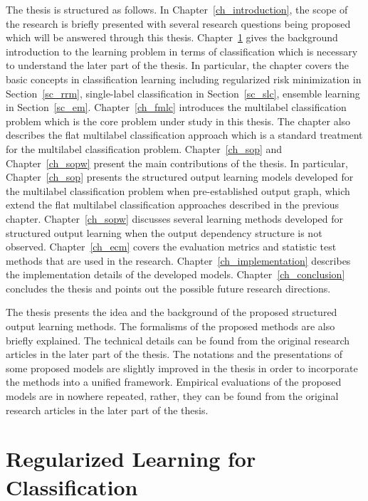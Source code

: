 The thesis is structured as follows.
In Chapter~\ref{ch_introduction}, the scope of the research is briefly presented with several research questions being proposed which will be answered through this thesis.
Chapter~\ref{ch_rlc} gives the background introduction to the learning problem in terms of classification which is necessary to understand the later part of the thesis.
In particular, the chapter covers the basic concepts in classification learning including regularized risk minimization in Section~\ref{sc_rrm}, single-label classification in Section~\ref{sc_slc}, ensemble learning in Section~\ref{sc_em}.
Chapter~\ref{ch_fmlc} introduces the multilabel classification problem which is the core problem under study in this thesis.
The chapter also describes the flat multilabel classification approach which is a standard treatment for the multilabel classification problem.
Chapter~\ref{ch_sop} and Chapter~\ref{ch_sopw} present the main contributions of the thesis.
In particular, Chapter~\ref{ch_sop} presents the structured output learning models developed for the multilabel classification problem when pre-established output graph, which extend the flat multilabel classification approaches described in the previous chapter.
Chapter~\ref{ch_sopw} discusses several learning methods developed for structured output learning when the output dependency structure is not observed.
Chapter~\ref{ch_ecm} covers the evaluation metrics and statistic test methods that are used in the research.
Chapter~\ref{ch_implementation} describes the implementation details of the developed models.
Chapter~\ref{ch_conclusion} concludes the thesis and points out the possible future research directions.

The thesis presents the idea and the background of the proposed structured output learning methods.
The formalisms of the proposed methods are also briefly explained.
The technical details can be found from the original research articles in the later part of the thesis.
The notations and the presentations of some proposed models are slightly improved in the thesis in order to incorporate the methods into a unified framework.
Empirical evaluations of the proposed models are in nowhere repeated, rather, they can be found from the original research articles in the later part of the thesis.



%
%
%
\chapter{Regularized Learning for Classification} \label{ch_rlc}



